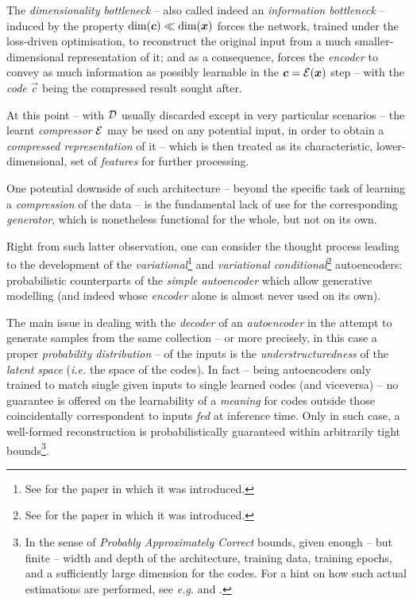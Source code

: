 The \textit{dimensionality bottleneck} -- also called indeed an \textit{information bottleneck} -- induced by the property $\text{dim}(\bm{c}) \ll \text{dim}(\bm{x})$ forces the network, trained under the loss-driven optimisation, to reconstruct the original input from a much smaller-dimensional representation of it; and as a consequence, forces the \textit{encoder} to convey as much information as possibly learnable in the $\bm{c} = \mathcal{E}(\bm{x})$ step -- with the \textit{code} $\vec{c}$ being the compressed result sought after.

At this point -- with $\mathcal{D}$ usually discarded except in very particular scenarios -- the learnt \textit{compressor} $\mathcal{E}$ may be used on any potential input, in order to obtain a \textit{compressed representation} of it -- which is then treated as its characteristic, lower-dimensional, set of \textit{features} for further processing.

One potential downside of such architecture -- beyond the specific task of learning a \textit{compression} of the data -- is the fundamental lack of use for the corresponding \textit{generator}, which is nonetheless functional for the whole, but not on its own.

Right from such latter observation, one can consider the thought process leading to the development of the \textit{variational}\footnote{See \cite{KingmaWelling2014AutoEncoding} for the paper in which it was introduced.} and \textit{variational conditional}\footnote{See \cite{SohnEtAl2015CVAE} for the paper in which it was introduced.} autoencoders: probabilistic counterparts of the \textit{simple autoencoder} which allow generative modelling (and indeed whose \textit{encoder} alone is almost never used on its own).

The main issue in dealing with the \textit{decoder} of an \textit{autoencoder} in the attempt to generate samples from the same collection -- or more precisely, in this case a proper \textit{probability distribution} -- of the inputs is the \textit{understructuredness} of the \textit{latent space} (\textit{i.e.} the space of the codes). In fact -- being autoencoders only trained to match single given inputs to single learned codes (and viceversa) -- no guarantee is offered on the learnability of a \textit{meaning} for codes outside those coincidentally correspondent to inputs \textit{fed} at inference time. Only in such case, a well-formed reconstruction is probabilistically guaranteed within arbitrarily tight bounds\footnote{In the sense of \textit{Probably Approximately Correct} bounds, given enough -- but finite -- width and depth of the architecture, training data, training epochs, and a sufficiently large dimension for the codes. For a hint on how such actual estimations are performed, see \textit{e.g.} \cite{EpsteinMeir2019AEPAC} and \cite{ZehaoEtAl2020AEPAC}.}.

